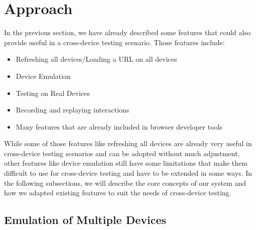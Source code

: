 \chapter{Approach}

In the previous section, we have already described some features that could also provide useful in a cross-device testing scenario. Those features include:
\begin{itemize}
	\item Refreshing all devices/Loading a URL on all devices
	\item Device Emulation
	\item Testing on Real Devices
	\item Recording and replaying interactions
	\item Many features that are already included in browser developer tools
\end{itemize}

While some of those features like refreshing all devices are already very useful in cross-device testing scenarios and can be adopted without much adjustment, other features like device emulation still have some limitations that make them difficult to use for cross-device testing and have to be extended in some ways. In the following subsections, we will describe the core concepts of our system and how we adapted existing features to suit the needs of cross-device testing.

\section{Emulation of Multiple Devices}

